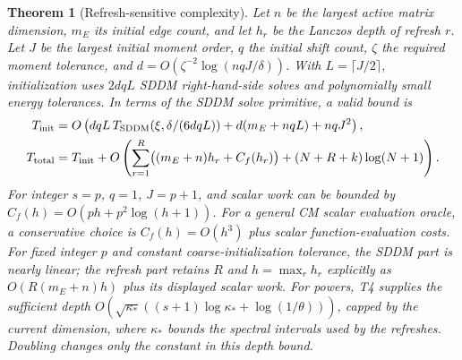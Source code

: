 \documentclass[11pt]{article}
\newtheorem{theorem}{Theorem}
\begin{document}
\begin{theorem}[Refresh-sensitive complexity]\label{thm:lazycost}
Let $n$ be the largest active matrix dimension, $m_E$ its initial
edge count, and let $h_r$ be the Lanczos depth of refresh $r$.
Let $J$ be the largest initial moment order, $q$ the initial shift
count, $\zeta$ the required moment tolerance, and
$d=O(\zeta^{-2}\log(nqJ/\delta))$.
With $L=\lceil J/2\rceil$, initialization uses $2dqL$ SDDM
right-hand-side solves and polynomially small energy tolerances.
In terms of the SDDM solve primitive, a valid bound is
\begin{align}\label{eq:lazycost}
 T_{\rm init}
 &=O\left(dqL\,T_{\rm SDDM}(\xi,\delta/(6dqL))
       +d(m_E+nqL)+nqJ^2\right),\notag\\
 T_{\rm total}
 &=T_{\rm init}
   +O\left(\sum_{r=1}^R\bigl((m_E+n)h_r+C_f(h_r)\bigr)
       +(N+R+k)\log(N+1)\right).
\end{align}
For integer $s=p$, $q=1$, $J=p+1$, and scalar work can be bounded
by $C_f(h)=O(ph+p^2\log(h+1))$. For a general CM scalar evaluation
oracle, a conservative choice is $C_f(h)=O(h^3)$ plus scalar
function-evaluation costs. For fixed integer $p$ and constant
coarse-initialization tolerance, the SDDM part is nearly linear;
the refresh part retains $R$ and $h=\max_r h_r$ explicitly as
$O(R(m_E+n)h)$ plus its displayed scalar work.
For powers, T4 supplies the sufficient depth
$O(\sqrt{\kappa_*}((s+1)\log\kappa_*+\log(1/\theta)))$,
capped by the current dimension, where $\kappa_*$ bounds the
spectral intervals used by the refreshes. Doubling changes only
the constant in this depth bound.
\end{theorem}
\end{document}
